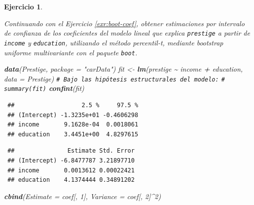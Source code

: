 \documentclass[
  spanish,
  10pt,
]{book}
\newenvironment{Shaded}{\begin{snugshade}}{\end{snugshade}}
\newcommand{\AttributeTok}[1]{\textcolor[rgb]{0.13,0.29,0.53}{#1}}
\newcommand{\CommentTok}[1]{\textcolor[rgb]{0.56,0.35,0.01}{\textit{#1}}}
\newcommand{\DecValTok}[1]{\textcolor[rgb]{0.00,0.00,0.81}{#1}}
\newcommand{\FunctionTok}[1]{\textcolor[rgb]{0.13,0.29,0.53}{\textbf{#1}}}
\newcommand{\NormalTok}[1]{#1}
\newcommand{\OtherTok}[1]{\textcolor[rgb]{0.56,0.35,0.01}{#1}}
\newcommand{\SpecialCharTok}[1]{\textcolor[rgb]{0.81,0.36,0.00}{\textbf{#1}}}
\newcommand{\StringTok}[1]{\textcolor[rgb]{0.31,0.60,0.02}{#1}}
\theoremstyle{break}
\newtheorem{exercise}{Ejercicio}[chapter]
\theoremstyle{nonumberplain}
\renewcommand{\CommentTok}[1]{\textcolor[rgb]{0.41,0.41,0.41}{\texttt{#1}}}
\begin{document}
\begin{exercise}
\protect\hypertarget{exr:boot-coef-stud}{}\label{exr:boot-coef-stud}

Continuando con el Ejercicio \ref{exr:boot-coef}, obtener estimaciones por intervalo de confianza de los coeficientes del modelo lineal que explica \texttt{prestige} a partir de \texttt{income} y \texttt{education}, utilizando el método percentil-\emph{t}, mediante bootstrap uniforme multivariante con el paquete \texttt{boot}.

\begin{Shaded}
\begin{Highlighting}[]
\FunctionTok{data}\NormalTok{(Prestige, }\AttributeTok{package =} \StringTok{"carData"}\NormalTok{)}
\NormalTok{fit }\OtherTok{\textless{}{-}} \FunctionTok{lm}\NormalTok{(prestige }\SpecialCharTok{\textasciitilde{}}\NormalTok{ income }\SpecialCharTok{+}\NormalTok{ education, }\AttributeTok{data =}\NormalTok{ Prestige)}
\CommentTok{\# Bajo las hipótesis estructurales del modelo:}
\CommentTok{\# summary(fit)}
\FunctionTok{confint}\NormalTok{(fit)}
\end{Highlighting}
\end{Shaded}

\begin{verbatim}
 ##                   2.5 %     97.5 %
 ## (Intercept) -1.3235e+01 -0.4606298
 ## income       9.1628e-04  0.0018061
 ## education    3.4451e+00  4.8297615
\end{verbatim}

\begin{Shaded}
\end{Shaded}

\begin{verbatim}
 ##               Estimate Std. Error
 ## (Intercept) -6.8477787 3.21897710
 ## income       0.0013612 0.00022421
 ## education    4.1374444 0.34891202
\end{verbatim}

\begin{Shaded}
\begin{Highlighting}[]
\FunctionTok{cbind}\NormalTok{(}\AttributeTok{Estimate =}\NormalTok{ coef[, }\DecValTok{1}\NormalTok{], }\AttributeTok{Variance =}\NormalTok{ coef[, }\DecValTok{2}\NormalTok{]}\SpecialCharTok{\^{}}\DecValTok{2}\NormalTok{)}
\end{Highlighting}
\end{Shaded}


\end{exercise}
\end{document}
